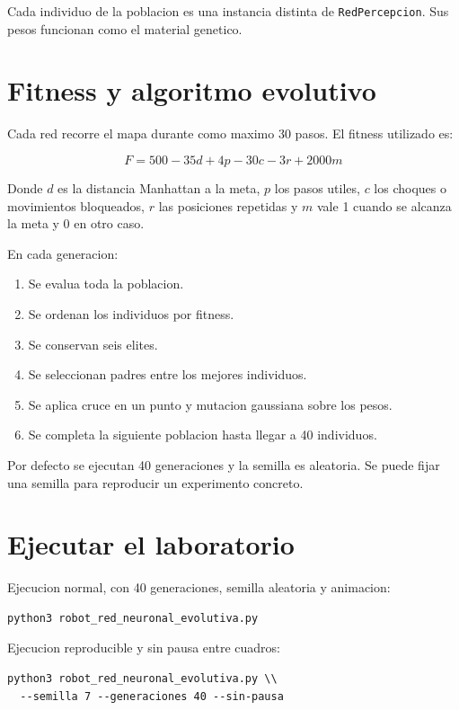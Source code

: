 \documentclass[11pt,a4paper]{article}
\begin{document}
Cada individuo de la poblacion es una instancia distinta de \texttt{RedPercepcion}. Sus pesos funcionan como el material genetico.

\section{Fitness y algoritmo evolutivo}
Cada red recorre el mapa durante como maximo 30 pasos. El fitness utilizado es:

\[
F = 500 - 35d + 4p - 30c - 3r + 2000m
\]

Donde $d$ es la distancia Manhattan a la meta, $p$ los pasos utiles, $c$ los choques o movimientos bloqueados, $r$ las posiciones repetidas y $m$ vale 1 cuando se alcanza la meta y 0 en otro caso.

En cada generacion:

\begin{enumerate}[leftmargin=*]
  \item Se evalua toda la poblacion.
  \item Se ordenan los individuos por fitness.
  \item Se conservan seis elites.
  \item Se seleccionan padres entre los mejores individuos.
  \item Se aplica cruce en un punto y mutacion gaussiana sobre los pesos.
  \item Se completa la siguiente poblacion hasta llegar a 40 individuos.
\end{enumerate}

Por defecto se ejecutan 40 generaciones y la semilla es aleatoria. Se puede fijar una semilla para reproducir un experimento concreto.

\section{Ejecutar el laboratorio}
Ejecucion normal, con 40 generaciones, semilla aleatoria y animacion:

\begin{lstlisting}[style=python]
python3 robot_red_neuronal_evolutiva.py
\end{lstlisting}

Ejecucion reproducible y sin pausa entre cuadros:

\begin{lstlisting}[style=python]
python3 robot_red_neuronal_evolutiva.py \\
  --semilla 7 --generaciones 40 --sin-pausa
\end{lstlisting}
\end{document}
